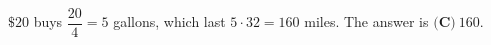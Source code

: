 $\$20$ buys $\dfrac{20}{4}=5$ gallons, which last $5\cdot32=160$ miles. The answer is $\boxed{\textbf{(C)}\ 160}$.
